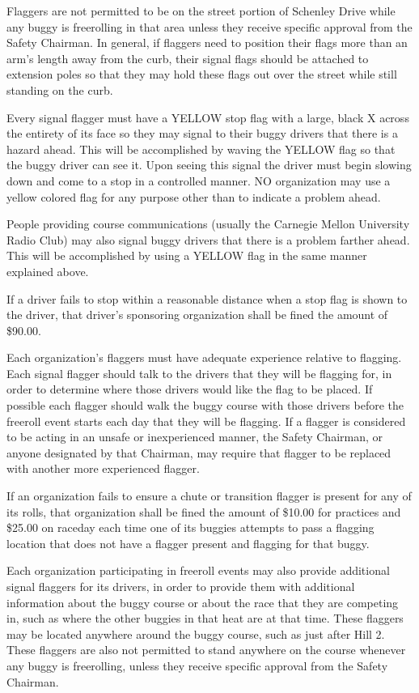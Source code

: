 	Flaggers are not permitted to be on the street portion of Schenley Drive while any buggy is freerolling in that area unless they receive specific approval from the Safety Chairman. In general, if flaggers need to position their flags more than an arm's length away from the curb, their signal flags should be attached to extension poles so that they may hold these flags out over the street while still standing on the curb.

	Every signal flagger must have a YELLOW stop flag with a large, black X across the entirety of its face so they may signal to their buggy drivers that there is a hazard ahead. This will be accomplished by waving the YELLOW flag so that the buggy driver can see it. Upon seeing this signal the driver must begin slowing down and come to a stop in a controlled manner. NO organization may use a yellow colored flag for any purpose other than to indicate a problem ahead.

	People providing course communications (usually the Carnegie Mellon University Radio Club) may also signal buggy drivers that there is a problem farther ahead. This will be accomplished by using a YELLOW flag in the same manner explained above.

	If a driver fails to stop within a reasonable distance when a stop flag is shown to the driver, that driver's sponsoring organization shall be fined the amount of \$90.00.

	Each organization's flaggers must have adequate experience relative to flagging. Each signal flagger should talk to the drivers that they will be flagging for, in order to determine where those drivers would like the flag to be placed. If possible each flagger should walk the buggy course with those drivers before the freeroll event starts each day that they will be flagging. If a flagger is considered to be acting in an unsafe or inexperienced manner, the Safety Chairman, or anyone designated by that Chairman, may require that flagger to be replaced with another more experienced flagger.

	If an organization fails to ensure a chute or transition flagger is present for any of its rolls, that organization shall be fined the amount of \$10.00 for practices and \$25.00 on raceday each time one of its buggies attempts to pass a flagging location that does not have a flagger present and flagging for that buggy.

	Each organization participating in freeroll events may also provide additional signal flaggers for its drivers, in order to provide them with additional information about the buggy course or about the race that they are competing in, such as where the other buggies in that heat are at that time. These flaggers may be located anywhere around the buggy course, such as just after Hill 2. These flaggers are also not permitted to stand anywhere on the course whenever any buggy is freerolling, unless they receive specific approval from the Safety Chairman.
	
